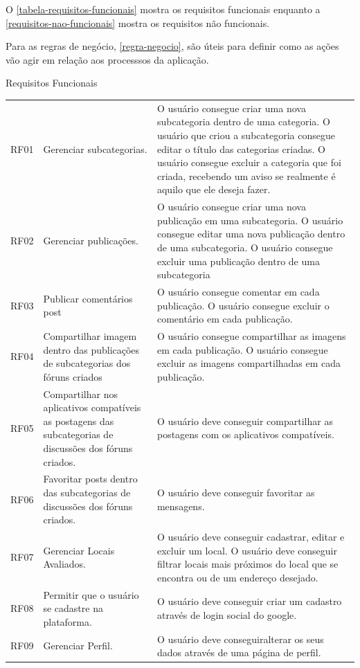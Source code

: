 O  \autoref{tabela-requisitos-funcionais} mostra os requisitos funcionais  enquanto a \autoref{requisitos-nao-funcionais} mostra os requisitos não funcionais. 

Para as regras de negócio, \autoref{regra-negocio}, são úteis para definir como as ações vão agir em relação aos processsos da aplicação. 



\begin{quadro}[htb]
	\centering
	\ABNTEXfontereduzida
	\caption[Requisitos Funcionais]{Requisitos Funcionais}
	\label{tabela-requisitos-funcionais}
\end{quadro}
\begin{longtable}{|p{2.0cm}|p{6.5cm}|p{6.5cm}|}
	\hline
	\thead{Código} & \thead{Requisito}  & \thead{Descrição} \\
	\hline
	RF01 & Gerenciar subcategorias. &
	O usuário consegue criar uma nova subcategoria dentro de uma categoria.
	O usuário que criou a subcategoria consegue editar o título das categorias criadas.
	O usuário consegue excluir a categoria que foi criada, recebendo um aviso se realmente é aquilo que ele deseja fazer.
	\\
	\hline
	RF02 & Gerenciar publicações.   & O usuário consegue criar uma nova publicação em uma subcategoria. 
	O usuário consegue editar uma nova publicação dentro de uma subcategoria. 
	O usuário consegue excluir uma publicação dentro de uma subcategoria\\
	\hline
	RF03 & Publicar comentários post  & O usuário consegue comentar em cada publicação. O usuário consegue excluir o comentário em cada publicação. \\
	\hline
	RF04 & Compartilhar imagem dentro das publicações de subcategorias dos fóruns criados &
	O usuário consegue compartilhar as imagens em cada publicação. O usuário consegue excluir as imagens compartilhadas em cada publicação.\\
	\hline
	RF05 & Compartilhar nos aplicativos compatíveis as postagens das subcategorias de discussões dos fóruns criados.  & O usuário deve conseguir compartilhar as postagens com os aplicativos compatíveis.\\
	\hline
	RF06 & Favoritar posts dentro das subcategorias de discussões dos fóruns criados. & O usuário deve conseguir favoritar as mensagens. \\
	\hline
	RF07 & Gerenciar Locais Avaliados. & O usuário deve conseguir cadastrar, editar e excluir um local. O usuário deve conseguir filtrar locais mais próximos do local que se encontra ou de um endereço desejado. \\
	\hline
	RF08 & Permitir que o usuário se cadastre na plataforma. & O usuário deve conseguir criar um cadastro através de login social do google.\\
	\hline
	RF09 & Gerenciar Perfil.  &
	O usuário deve conseguiralterar os seus dados através de uma página de perfil.  \\
	\hline
\end{longtable}

